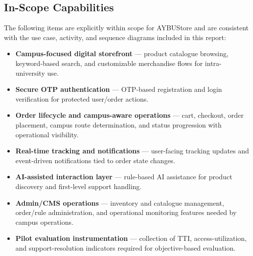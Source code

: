 \documentclass[11pt,a4paper]{article}
\begin{document}
\subsection{In-Scope Capabilities}
The following items are explicitly within scope for AYBUStore and are
consistent with the use case, activity, and sequence diagrams included
in this report:
\begin{itemize}[leftmargin=*]
    \item \textbf{Campus-focused digital storefront} --- product
    catalogue browsing, keyword-based search, and customizable
    merchandise flows for intra-university use.
    \item \textbf{Secure OTP authentication} --- OTP-based registration
    and login verification for protected user/order actions.
    \item \textbf{Order lifecycle and campus-aware operations} ---
    cart, checkout, order placement, campus route determination, and
    status progression with operational visibility.
    \item \textbf{Real-time tracking and notifications} --- user-facing
    tracking updates and event-driven notifications tied to order state
    changes.
    \item \textbf{AI-assisted interaction layer} --- rule-based AI
    assistance for product discovery and first-level support handling.
    \item \textbf{Admin/CMS operations} --- inventory and catalogue
    management, order/rule administration, and operational monitoring
    features needed by campus operations.
    \item \textbf{Pilot evaluation instrumentation} --- collection of
    TTI, access-utilization, and support-resolution indicators required
    for objective-based evaluation.
\end{itemize}
\end{document}
